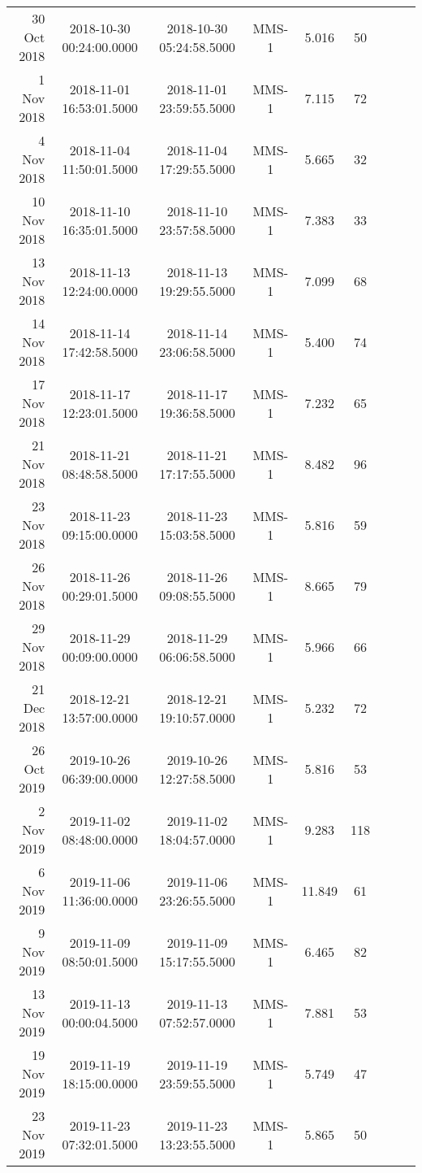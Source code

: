 \begin{longtable}{r|cccccccc}
30 Oct 2018    &  2018-10-30 00:24:00.0000 &  2018-10-30 05:24:58.5000 &  MMS-1 &    5.016 &     50 \\
1 Nov 2018     &  2018-11-01 16:53:01.5000 &  2018-11-01 23:59:55.5000 &  MMS-1 &    7.115 &     72 \\
4 Nov 2018     &  2018-11-04 11:50:01.5000 &  2018-11-04 17:29:55.5000 &  MMS-1 &    5.665 &     32 \\
10 Nov 2018    &  2018-11-10 16:35:01.5000 &  2018-11-10 23:57:58.5000 &  MMS-1 &    7.383 &     33 \\
13 Nov 2018    &  2018-11-13 12:24:00.0000 &  2018-11-13 19:29:55.5000 &  MMS-1 &    7.099 &     68 \\
14 Nov 2018    &  2018-11-14 17:42:58.5000 &  2018-11-14 23:06:58.5000 &  MMS-1 &    5.400 &     74 \\
17 Nov 2018    &  2018-11-17 12:23:01.5000 &  2018-11-17 19:36:58.5000 &  MMS-1 &    7.232 &     65 \\
21 Nov 2018    &  2018-11-21 08:48:58.5000 &  2018-11-21 17:17:55.5000 &  MMS-1 &    8.482 &     96 \\
23 Nov 2018    &  2018-11-23 09:15:00.0000 &  2018-11-23 15:03:58.5000 &  MMS-1 &    5.816 &     59 \\
26 Nov 2018    &  2018-11-26 00:29:01.5000 &  2018-11-26 09:08:55.5000 &  MMS-1 &    8.665 &     79 \\
29 Nov 2018    &  2018-11-29 00:09:00.0000 &  2018-11-29 06:06:58.5000 &  MMS-1 &    5.966 &     66 \\
21 Dec 2018    &  2018-12-21 13:57:00.0000 &  2018-12-21 19:10:57.0000 &  MMS-1 &    5.232 &     72 \\
26 Oct 2019    &  2019-10-26 06:39:00.0000 &  2019-10-26 12:27:58.5000 &  MMS-1 &    5.816 &     53 \\
2 Nov 2019     &  2019-11-02 08:48:00.0000 &  2019-11-02 18:04:57.0000 &  MMS-1 &    9.283 &    118 \\
6 Nov 2019     &  2019-11-06 11:36:00.0000 &  2019-11-06 23:26:55.5000 &  MMS-1 &   11.849 &     61 \\
9 Nov 2019     &  2019-11-09 08:50:01.5000 &  2019-11-09 15:17:55.5000 &  MMS-1 &    6.465 &     82 \\
13 Nov 2019    &  2019-11-13 00:00:04.5000 &  2019-11-13 07:52:57.0000 &  MMS-1 &    7.881 &     53 \\
19 Nov 2019    &  2019-11-19 18:15:00.0000 &  2019-11-19 23:59:55.5000 &  MMS-1 &    5.749 &     47 \\
23 Nov 2019    &  2019-11-23 07:32:01.5000 &  2019-11-23 13:23:55.5000 &  MMS-1 &    5.865 &     50 \\

\end{longtable}
